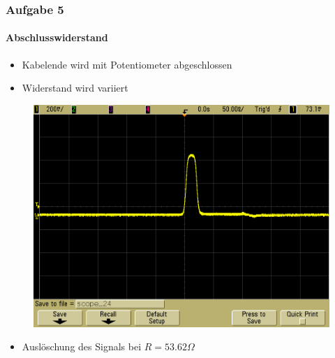 \begin{frame}
    \frametitle{Aufgabe 5}
    \framesubtitle{Abschlusswiderstand}
    \begin{itemize}
        \item Kabelende wird mit Potentiometer abgeschlossen
        \item Widerstand wird variiert
    \end{itemize}
    \begin{figure}[H]
    \begin{center}
            \includegraphics[scale=0.2]{./img/5b_Potentiometer_2.png}
    \end{center}
    \end{figure}
    \begin{itemize}
        \item Auslöschung des Signals bei $R=53.62 \Omega$
    \end{itemize}
\end{frame}
